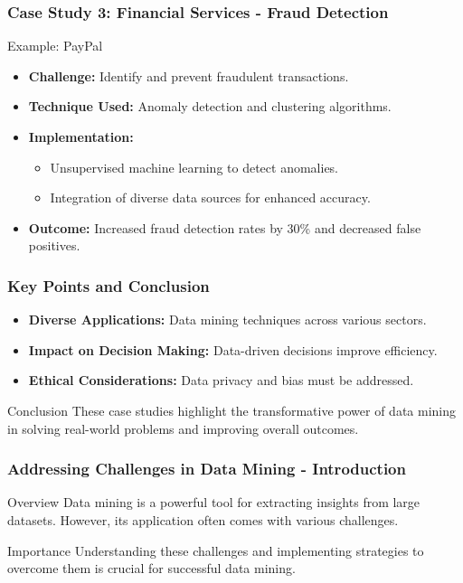 \documentclass{beamer}
\begin{document}
\begin{frame}[fragile]
    \frametitle{Case Study 3: Financial Services - Fraud Detection}
    \begin{block}{Example: PayPal}
        \begin{itemize}
            \item \textbf{Challenge:} Identify and prevent fraudulent transactions.
            \item \textbf{Technique Used:} Anomaly detection and clustering algorithms.
            \item \textbf{Implementation:}
                \begin{itemize}
                    \item Unsupervised machine learning to detect anomalies.
                    \item Integration of diverse data sources for enhanced accuracy.
                \end{itemize}
            \item \textbf{Outcome:} Increased fraud detection rates by 30\% and decreased false positives.
        \end{itemize}
    \end{block}
\end{frame}

\begin{frame}[fragile]
    \frametitle{Key Points and Conclusion}
    \begin{itemize}
        \item \textbf{Diverse Applications:} Data mining techniques across various sectors.
        \item \textbf{Impact on Decision Making:} Data-driven decisions improve efficiency.
        \item \textbf{Ethical Considerations:} Data privacy and bias must be addressed.
    \end{itemize}
    
    \begin{block}{Conclusion}
        These case studies highlight the transformative power of data mining in solving real-world problems and improving overall outcomes. 
    \end{block}
\end{frame}

\begin{frame}[fragile]
    \frametitle{Addressing Challenges in Data Mining - Introduction}
    \begin{block}{Overview}
        Data mining is a powerful tool for extracting insights from large datasets. However, its application often comes with various challenges. 
    \end{block}
    \begin{block}{Importance}
        Understanding these challenges and implementing strategies to overcome them is crucial for successful data mining.
    \end{block}
\end{frame}
\end{document}
